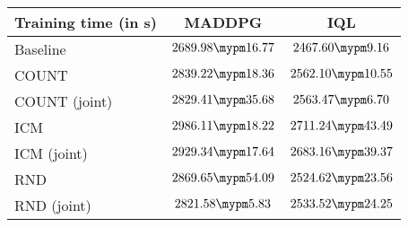 \begin{tabular}{l | c c}
	Training time (in s) & MADDPG & IQL\\ \toprule
		Baseline & $2689.98 \mypm 16.77$ & $2467.60 \mypm 9.16$ \\ \midrule
	COUNT & $2839.22 \mypm 18.36$ & $2562.10 \mypm 10.55$ \\
	COUNT (joint) & $2829.41 \mypm 35.68$ & $2563.47 \mypm 6.70$ \\\midrule
	ICM & $2986.11 \mypm 18.22$ & $2711.24 \mypm 43.49$ \\
	ICM (joint) & $2929.34 \mypm 17.64$ & $2683.16 \mypm 39.37$ \\\midrule
	RND & $2869.65 \mypm 54.09$ & $2524.62 \mypm 23.56$ \\
	RND (joint) & $2821.58 \mypm 5.83$ & $2533.52 \mypm 24.25$ \\\midrule
\end{tabular}
